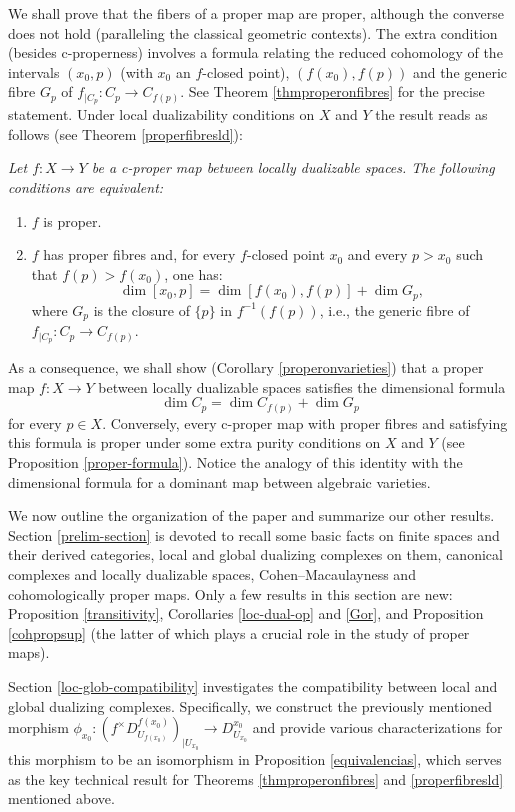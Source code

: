 \documentclass[amssymb,amscd,11pt,20pt]{amsart}
\newcommand{\0}{\mathbf 0}
\theoremstyle{plain}
\numberwithin{equation}{thm}
\begin{document}
We shall prove that the fibers of a proper map are proper, although the converse does not hold (paralleling the classical geometric contexts). The extra condition (besides c-properness) involves a formula relating the reduced cohomology of the intervals $(x_0,p)$ (with $x_0$ an $f$-closed point), $(f(x_0),f(p))$ and the generic fibre  $G_p$     of $f_{\vert C_p}\colon C_p\to C_{f(p)}$. See Theorem \ref{thmproperonfibres} for the precise statement. Under local dualizability conditions on $X$ and $Y$ the result reads as follows (see Theorem \ref{properfibresld}):

\smallskip
{} {\it  Let $f\colon X\to Y$ be a c-proper map between locally dualizable spaces. The following conditions are equivalent:
\begin{enumerate}\item $f$ is proper.
\item $f$ has proper fibres and, for every $f$-closed point $x_0$ and every $p>x_0$ such that $f(p)> f(x_0)$, one has: 
\[\dim [x_0,p]=\dim [f(x_0),f(p)] + \dim G_p, 
\] where $G_p$  is the closure of $\{p\}$ in $f^{-1}(f(p))$, i.e.,  the generic fibre of $f_{\vert C_p}\colon C_p\to C_{f(p)}$.
\end{enumerate}}
\smallskip

As a consequence, we shall show (Corollary \ref{properonvarieties}) that a proper map $f\colon X\to Y$ between locally dualizable spaces satisfies the dimensional formula
\[ \dim C_p=\dim C_{f(p)}+\dim G_p\] for every $p\in X$. Conversely, every c-proper map with proper fibres and satisfying this formula is proper under some extra purity conditions on $X$ and $Y$ (see Proposition \ref{proper-formula}). Notice the analogy of this identity with the dimensional formula for a dominant map between algebraic varieties.

We now outline the organization of the paper and summarize our other results.  Section \ref{prelim-section} is  devoted to recall some basic facts on finite spaces and their derived categories, local and global dualizing complexes on them, canonical complexes and locally dualizable spaces, Cohen--Macaulayness and cohomologically proper maps. Only a few results in this section  are new: Proposition \ref{transitivity}, Corollaries \ref{loc-dual-op} and \ref{Gor}, and Proposition \ref{cohpropsup} (the latter of which plays a crucial role in the study of proper maps).

Section \ref{loc-glob-compatibility} investigates the compatibility between local and global dualizing complexes. Specifically,  we  construct the previously mentioned morphism $\phi_{x_0}\colon (f^\times D_{U_{f(x_0)}}^{f(x_0)})_{\vert U_{x_0}}\to D_{U_{x_0}}^{x_0}$ and provide various  characterizations for this morphism to be an isomorphism in Proposition \ref{equivalencias}, which serves as the key technical result for  Theorems \ref{thmproperonfibres} and \ref{properfibresld} mentioned above.
\end{document}

